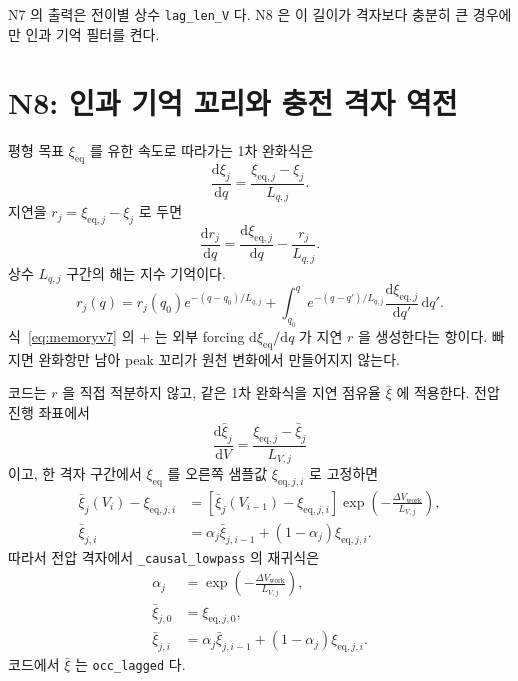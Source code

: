 \documentclass[11pt,a4paper]{article}
\newcommand{\dd}{\mathrm{d}}
\newcommand{\eq}{\mathrm{eq}}
\newcommand{\work}{\mathrm{work}}
\begin{document}
N7 의 출력은 전이별 상수 \texttt{lag\_len\_V} 다. N8 은 이 길이가 격자보다 충분히 큰 경우에만 인과 기억 필터를 켠다.

\section{N8: 인과 기억 꼬리와 충전 격자 역전}\label{sec:n8}
평형 목표 $\xi_{\eq}$ 를 유한 속도로 따라가는 1차 완화식은
\begin{equation}
\frac{\dd \xi_j}{\dd q}=\frac{\xi_{\eq,j}-\xi_j}{L_{q,j}}.
\label{eq:relaxqv7}
\end{equation}
지연을 $r_j=\xi_{\eq,j}-\xi_j$ 로 두면
\begin{equation}
\frac{\dd r_j}{\dd q}=\frac{\dd \xi_{\eq,j}}{\dd q}-\frac{r_j}{L_{q,j}}.
\label{eq:rv7}
\end{equation}
상수 $L_{q,j}$ 구간의 해는 지수 기억이다.
\begin{equation}
r_j(q)=r_j(q_0)e^{-(q-q_0)/L_{q,j}}
+\int_{q_0}^{q}e^{-(q-q')/L_{q,j}}
\frac{\dd\xi_{\eq,j}}{\dd q'}\,\dd q'.
\label{eq:memoryv7}
\end{equation}
식~\eqref{eq:memoryv7} 의 $+$ 는 외부 forcing $\dd\xi_{\eq}/\dd q$ 가 지연 $r$ 을 생성한다는 항이다. 빠지면 완화항만 남아 peak 꼬리가 원천 변화에서 만들어지지 않는다.

코드는 $r$ 을 직접 적분하지 않고, 같은 1차 완화식을 지연 점유율 $\bar\xi$ 에 적용한다. 전압 진행 좌표에서
\begin{equation}
\frac{\dd\bar\xi_j}{\dd V}=\frac{\xi_{\eq,j}-\bar\xi_j}{L_{V,j}}
\label{eq:lowpassode}
\end{equation}
이고, 한 격자 구간에서 $\xi_{\eq}$ 를 오른쪽 샘플값 $\xi_{\eq,j,i}$ 로 고정하면
\begin{align}
\bar\xi_j(V_i)-\xi_{\eq,j,i}
&=\left[\bar\xi_j(V_{i-1})-\xi_{\eq,j,i}\right]
\exp\!\left(-\frac{\Delta V_{\work}}{L_{V,j}}\right),\label{eq:lowpasssolve}\\
\bar\xi_{j,i}
&=\alpha_j\bar\xi_{j,i-1}+(1-\alpha_j)\xi_{\eq,j,i}.
\label{eq:lowpassderived}
\end{align}
따라서 전압 격자에서 \texttt{\_causal\_lowpass} 의 재귀식은
\begin{align}
\alpha_j&=\exp\!\left(-\frac{\Delta V_{\work}}{L_{V,j}}\right),\label{eq:alpha}\\
\bar\xi_{j,0}&=\xi_{\eq,j,0},\label{eq:initlag}\\
\bar\xi_{j,i}&=\alpha_j\bar\xi_{j,i-1}+(1-\alpha_j)\xi_{\eq,j,i}.
\label{eq:lowpass}
\end{align}
코드에서 $\bar\xi$ 는 \texttt{occ\_lagged} 다.
\end{document}

